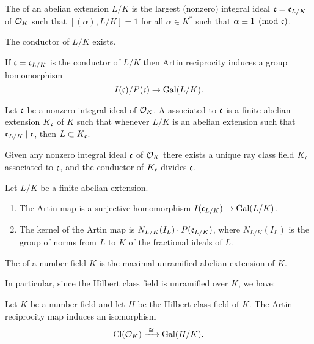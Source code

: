 \begin{definition}
  The  of an abelian extension $L/K$ is the 
largest (nonzero) integral ideal $\mathfrak{c}=\mathfrak{c}_{L/K}$ of
  $\mathcal{O}_K$ such that $[(\alpha),L/K] = 1$ for all $\alpha\in K^*$ such
  that $\alpha \equiv 1\pmod{\mathfrak{c}}$.
\end{definition}

\begin{proposition}
The conductor of $L/K$ exists. 
\end{proposition} 

If $\mathfrak{c}=\mathfrak{c}_{L/K}$ is the conductor of $L/K$ then Artin reciprocity induces
a group homomorphism 
$$
  I(\mathfrak{c})/P(\mathfrak{c}) \to \operatorname{Gal}(L/K).
$$

\begin{definition}\label{defn:rcf}
Let $\mathfrak{c}$ be a nonzero integral ideal of $\mathcal{O}_K$.  A
 associated to $\mathfrak{c}$
is a finite abelian extension $K_{\mathfrak{c}}$ of
$K$ such that whenever $L/K$ is an abelian
extension such that $\mathfrak{c}_{L/K} \mid \mathfrak{c}$,
then $L\subset K_{\mathfrak{c}}$. 
\end{definition}

\begin{theorem}
Given any nonzero integral ideal $\mathfrak{c}$ of $\mathcal{O}_K$
there exists a unique ray class field $K_{\mathfrak{c}}$
associated to $\mathfrak{c}$, and the conductor of $K_{\mathfrak{c}}$
divides $\mathfrak{c}$.  
\end{theorem}


\begin{theorem}\label{thm:cft}
Let $L/K$ be a finite abelian extension.
\begin{enumerate}
\item The Artin map is a surjective homomorphism
$I(\mathfrak{c}_{L/K}) \to \operatorname{Gal}(L/K)$.
\item The kernel of the Artin map
is $N_{L/K}(I_L) \cdot P(\mathfrak{c}_{L/K})$, where $N_{L/K}(I_L)$
is the group of norms from $L$ to $K$ of the fractional
ideals of $L$.
\end{enumerate}
\end{theorem}

\begin{definition}
The  of a number field $K$ is the
maximal unramified abelian extension of $K$.
\end{definition}

In particular, since the Hilbert class field is unramified
over $K$, we have:
\begin{theorem}
Let $K$ be a number field and let $H$ be the Hilbert
class field of $K$.
The Artin reciprocity map induces an isomorphism
$$
  \operatorname{Cl}(\mathcal{O}_K) \xrightarrow{\,\,\cong\,\,} \operatorname{Gal}(H/K).
$$
\end{theorem}


